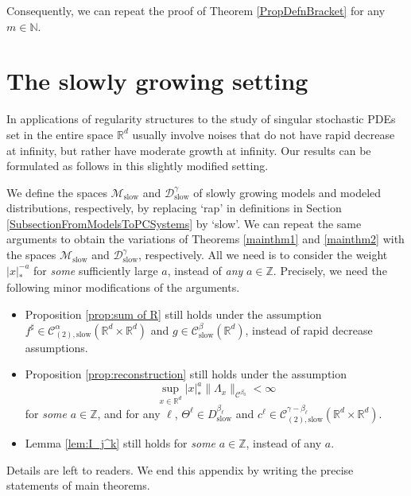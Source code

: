 \documentclass[10pt]{amsart}
\theoremstyle{plain}
\theoremstyle{definition}
\newcommand{\slow}{\mathrm{slow}}
\newcommand{\scrM}{\mathscr{M}}
\newcommand{\bbN}{\mathbb{N}}
\newcommand{\bbR}{\mathbb{R}}
\newcommand{\bbZ}{\mathbb{Z}}
\newcommand{\mcC}{\mathcal{C}}
\newcommand{\mcD}{\mathcal{D}}
\begin{document}
Consequently, we can repeat the proof of Theorem \ref{PropDefnBracket} for any $m\in\bbN$.

\section{The slowly growing setting}
\label{AppendixSlow}

In applications of regularity structures to the study of singular stochastic PDEs set in the entire space $\bbR^d$ usually involve noises that do not have rapid decrease at infinity, but rather have moderate growth at infinity. Our results can be formulated as follows in this slightly modified setting.

We define the spaces $\scrM_{\slow}$ and $\mcD_{\slow}^\gamma$ of slowly growing models and modeled distributions, respectively, by replacing `rap' in definitions in Section \ref{SubsectionFromModelsToPCSystems} by `slow'. We can repeat the same arguments to obtain the variations of Theorems \ref{mainthm1} and \ref{mainthm2} with the spaces $\scrM_{\slow}$ and $\mcD_{\slow}^\gamma$, respectively.
All we need is to consider the weight $|x|_*^{-a}$ for {\it some} sufficiently large $a$, instead of {\it any} $a\in\bbZ$.
Precisely, we need the following minor modifications of the arguments.
\begin{itemize}
\item Proposition \ref{prop:sum of R} still holds under the assumption $f^\sharp\in\mcC_{(2),\slow}^\alpha(\bbR^d\times\bbR^d)$ and $g\in\mcC_{\slow}^\beta(\bbR^d)$, instead of rapid decrease assumptions.
\item Proposition \ref{prop:reconstruction} still holds under the assumption
\[
\sup_{x\in\bbR^d}|x|_*^a\|\Lambda_x\|_{\mcC^{\beta_0}}<\infty
\]
for {\it some} $a\in\bbZ$, and for any $\ell$, $\Theta^\ell\in D_{\slow}^{\beta_\ell}$ and $c^\ell\in\mcC_{(2),\slow}^{\gamma-\beta_\ell}(\bbR^d\times\bbR^d)$.
\item Lemma \ref{lem:I_j^k} still holds for {\it some} $a\in\bbZ$, instead of any $a$.
\end{itemize}
Details are left to readers. We end this appendix by writing the precise statements of main theorems.
\end{document}
